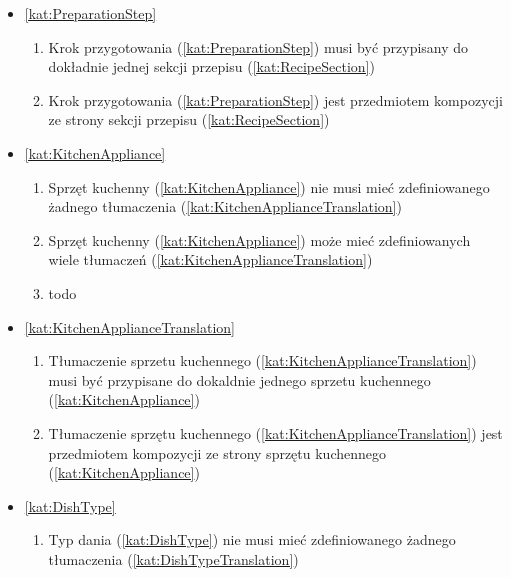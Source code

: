 \begin{itemize}[label={\textbf{Reguły dla}}, wide, labelwidth=!, labelindent=0pt]
\begin{enumerate}[label={\textbf{REG/\protect\threedigits{\arabic{enumi}}}}, wide, labelwidth=!, align=left, leftmargin=3cm, resume]
    \end{enumerate}
    \item\ref{kat:PreparationStep}
    \begin{enumerate}[label={\textbf{REG/\protect\threedigits{\arabic{enumi}}}}, wide, labelwidth=!, align=left, leftmargin=3cm, resume]
        \item Krok przygotowania (\ref{kat:PreparationStep}) musi być przypisany do dokładnie jednej sekcji przepisu (\ref{kat:RecipeSection})
        \item Krok przygotowania (\ref{kat:PreparationStep}) jest przedmiotem kompozycji ze strony sekcji przepisu (\ref{kat:RecipeSection})
    \end{enumerate}
    \item\ref{kat:KitchenAppliance}
    \begin{enumerate}[label={\textbf{REG/\protect\threedigits{\arabic{enumi}}}}, wide, labelwidth=!, align=left, leftmargin=3cm, resume]
        \item Sprzęt kuchenny (\ref{kat:KitchenAppliance}) nie musi mieć zdefiniowanego żadnego tłumaczenia (\ref{kat:KitchenApplianceTranslation})
        \item Sprzęt kuchenny (\ref{kat:KitchenAppliance}) może mieć zdefiniowanych wiele tłumaczeń (\ref{kat:KitchenApplianceTranslation})
        \item todo
    \end{enumerate}
    \item\ref{kat:KitchenApplianceTranslation}
    \begin{enumerate}[label={\textbf{REG/\protect\threedigits{\arabic{enumi}}}}, wide, labelwidth=!, align=left, leftmargin=3cm, resume]
        \item Tłumaczenie sprzetu kuchennego (\ref{kat:KitchenApplianceTranslation}) musi być przypisane do dokaldnie jednego sprzetu kuchennego (\ref{kat:KitchenAppliance})
        \item Tłumaczenie sprzętu kuchennego (\ref{kat:KitchenApplianceTranslation}) jest przedmiotem kompozycji ze strony sprzętu kuchennego (\ref{kat:KitchenAppliance})
    \end{enumerate}
    \item\ref{kat:DishType}
    \begin{enumerate}[label={\textbf{REG/\protect\threedigits{\arabic{enumi}}}}, wide, labelwidth=!, align=left, leftmargin=3cm, resume]
        \item Typ dania (\ref{kat:DishType}) nie musi mieć zdefiniowanego żadnego tłumaczenia (\ref{kat:DishTypeTranslation})

\end{enumerate}
\end{itemize}
